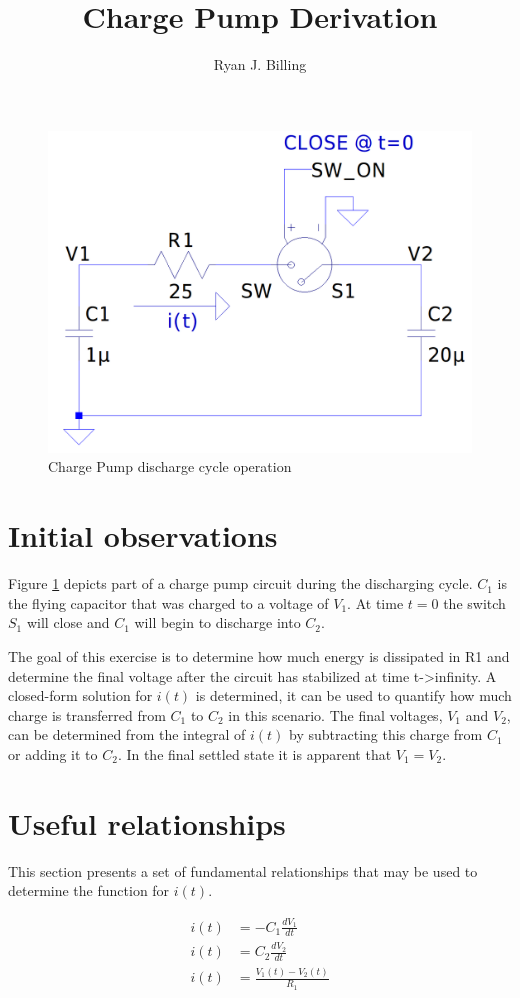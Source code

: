 \documentclass[12pt,letterpaper]{report}
\title{Charge Pump Derivation}
\author{Ryan J. Billing}
\begin{document}
	\maketitle
	\begin{figure}
		\centering
		\includegraphics[width=0.7\linewidth]{img/charge_pump_discharge_cycle}
		\caption{Charge Pump discharge cycle operation}
		\label{fig:chargepumpdischargecycle}
	\end{figure}
	
	\section{Initial observations}
	Figure \ref{fig:chargepumpdischargecycle} depicts part of a charge pump circuit during the discharging cycle.  $C_1$ is the flying capacitor that was charged to a voltage of $V_1$.  At time $t=0$ the switch $S_1$ will close and $C_1$ will begin to discharge into $C_2$.
	
	The goal of this exercise is to determine how much energy is dissipated in R1 and determine the final voltage after the circuit has stabilized at time t->infinity.  A closed-form solution for $i(t)$ is determined, it can be used to quantify how much charge is transferred from $C_1$ to $C_2$ in this scenario.   The final voltages, $V_1$ and $V_2$, can be determined from the integral of $i(t)$ by subtracting this charge from $C_1$ or adding it to $C_2$.  In the final settled state it is apparent that $V_1 = V_2$.
	
	\section{Useful relationships}
	This section presents a set of fundamental relationships that may be used to determine the function for $i(t)$.
	
	\begin{align}
		i(t) &= -C_1 \frac{dV_1}{dt} \label{c1deriv} \\
		i(t) &= C_2 \frac{dV_2}{dt} \label{c2deriv} \\
		i(t) &= \frac{V_1(t) - V_2(t)}{R_1} \label{itV}
	\end{align}
\end{document}
